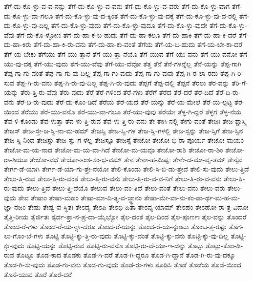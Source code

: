 {ತೆಗೆ-ದು-ಕೊ-ಳ್ಳು-ವ-ವ-ನನ್ನು
ತೆಗೆ-ದು-ಕೊ-ಳ್ಳು-ವ-ವನು
ತೆಗೆ-ದು-ಕೊ-ಳ್ಳು-ವ-ವರು
ತೆಗೆ-ದು-ಕೊ-ಳ್ಳು-ವಾಗ
ತೆಗೆ-ದು-ಕೊ-ಳ್ಳು-ವಾ-ಗಲೂ
ತೆಗೆ-ದು-ಕೊ-ಳ್ಳು-ವು-ದ-ಕ್ಕಿಂತ
ತೆಗೆ-ದು-ಕೊ-ಳ್ಳು-ವು-ದಕ್ಕೆ
ತೆಗೆ-ದು-ಕೊ-ಳ್ಳು-ವು-ದ-ರಲ್ಲಿ
ತೆಗೆ-ದು-ಕೊ-ಳ್ಳು-ವು-ದಿಲ್ಲ
ತೆಗೆ-ದು-ಕೊ-ಳ್ಳು-ವುದು
ತೆಗೆ-ದು-ಕೊ-ಳ್ಳು-ವುದೂ
ತೆಗೆ-ದು-ಕೊ-ಳ್ಳು-ವುದೇ
ತೆಗೆ-ದು-ಕೊ-ಳ್ಳು-ವೆವು
ತೆಗೆ-ದು-ಕೊ-ಳ್ಳೋಣ
ತೆಗೆ-ದು-ಹಾ-ಕ-ಬ-ಹುದು
ತೆಗೆ-ದು-ಹಾ-ಕಲೂ
ತೆಗೆ-ದು-ಹಾಕಿ
ತೆಗೆ-ದು-ಹಾ-ಕಿ-ದರೆ
ತೆಗೆ-ದು-ಹಾ-ಕಿರು
ತೆಗೆ-ದು-ಹಾ-ಕಿ-ರು-ವನು
ತೆಗೆ-ದು-ಹಾ-ಕು-ವಂತೆ
ತೆಗೆಯ
ತೆಗೆ-ಯ-ಬ-ಹುದು
ತೆಗೆ-ಯ-ಬೇ-ಕಾ-ದರೆ
ತೆಗೆ-ಯ-ಬೇಕು
ತೆಗೆಯು
ತೆಗೆ-ಯು-ತ್ತಾನೆ
ತೆಗೆ-ಯು-ತ್ತಾ-ನೆಯೊ
ತೆಗೆ-ಯುವ
ತೆಗೆ-ಯು-ವನು
ತೆಗೆ-ಯು-ವನೋ
ತೆಗೆ-ಯು-ವು-ದಕ್ಕೆ
ತೆಗೆ-ಯು-ವುದು
ತೆಗೆ-ಯು-ವೆವು
ತೆಗೆ-ಯು-ವೆವೋ
ತೆತ್ತ
ತೆನೆ
ತೆನೆ-ಗಳನ್ನೆಲ್ಲ
ತೆನೆ-ಯನ್ನು
ತೆಪ್ಪ-ಗಾಗಿ
ತೆಪ್ಪ-ಗಾ-ಗು-ವಂತೆ
ತೆಪ್ಪ-ಗಾ-ಗು-ವು-ದಿಲ್ಲ
ತೆಪ್ಪ-ಗಾ-ಗು-ವುದು
ತೆಪ್ಪ-ಗಾ-ಗು-ವುವು
ತೆಪ್ಪ-ಗಿ-ರ-ಲಾ-ರದು
ತೆಪ್ಪ-ಗಿ-ರಿ-ಸುವ
ತೆಪ್ಪ-ಗಿ-ರು-ವನು
ತೆಪ್ಪ-ಗಿ-ರು-ವು-ದಿಲ್ಲ
ತೆಪ್ಪ-ಗಿ-ರು-ವುದು
ತೆಪ್ಪಗೆ
ತೆಪ್ಪ-ದಲ್ಲಿ
ತೆಪ್ಪನೆ
ತೆರಲು
ತೆರ-ವನ್ನು
ತೆರಿ-ಗೆ-ಯನ್ನು
ತೆರು-ತ್ತಿ-ರು-ವೆವು
ತೆರು-ವುದು
ತೆರೆ
ತೆರೆ-ಗಳಿಂದ
ತೆರೆ-ಗಳು
ತೆರೆಗೆ
ತೆರೆದ
ತೆರೆ-ದರೆ
ತೆರೆ-ದಿದೆ
ತೆರೆ-ದಿ-ರು-ವನು
ತೆರೆ-ದಿ-ರು-ವುದು
ತೆರೆ-ದು-ಕೊಂ-ಡಿದೆ
ತೆರೆಯ
ತೆರೆ-ಯದೆ
ತೆರೆ-ಯನ್ನು
ತೆರೆ-ಯ-ಮೇಲೆ
ತೆರೆ-ಯ-ಲ್ಪಟ್ಟ
ತೆರೆ-ಯಿಂದ
ತೆರೆಯು
ತೆರೆ-ಯು-ವನೊ
ತೆರೆ-ಯು-ವಾ-ಗಲೂ
ತೆರೆ-ಯು-ವುವು
ತೆರೆಯೇ
ತೆಳ್ಳ-ಗಿ-ದ್ದರೆ
ತೆಳ್ಳಗೆ
ತೆಳ್ಳ-ನೆಯ
ತೆವ-ಳಿ-ಕೊಂಡು
ತೆವ-ಳುತ್ತಾ
ತೆವ-ಳು-ತ್ತಿ-ರುವ
ತೆವ-ಳು-ತ್ತಿ-ರು-ವನು
ತೇ
ತೇಗಿ-ನಲ್ಲಿ
ತೇಗು-ವಂತೆ
ತೇಜಃ
ತೇಜ-ಶ್ಚಾಸ್ಮಿ
ತೇಜಸ್
ತೇಜ-ಸ್ತೇ-ಜ-ಸ್ವಿ-ನಾ-ಮ-ಹಮ್
ತೇಜಸ್ವಿ
ತೇಜ-ಸ್ವಿ-ಗಳ
ತೇಜ-ಸ್ವಿ-ಗಳಲ್ಲಿ
ತೇಜ-ಸ್ಸನ್ನು
ತೇಜ-ಸ್ಸಿಗೆ
ತೇಜ-ಸ್ಸಿನ
ತೇಜ-ಸ್ಸಿ-ನಿಂದ
ತೇಜಸ್ಸು
ತೇಜ-ಸ್ಸು-ಗ-ಳೆಲ್ಲ
ತೇಜಸ್ಸೂ
ತೇಜಸ್ಸೆ
ತೇಜೋ
ತೇಜೋ-ಭಿ-ರಾ-ಪೂರ್ಯ
ತೇಜೋ-ಮಯಂ
ತೇಜೋ-ಮ-ಯ-ನಾದ
ತೇಜೋ-ಮ-ಯ-ವಾ-ಗಿದೆ
ತೇಜೋ-ಮ-ಯವೂ
ತೇಜೋ-ರಾಶಿ
ತೇಜೋ-ರಾ-ಶಿಂ
ತೇಜೋ-ರಾ-ಶಿಯೂ
ತೇಜೋ-ವಧೆ
ತೇಜೋ-ಽಂಶ-ಸಂ-ಭ-ವಮ್
ತೇನ
ತೇನಾ-ಹ-ಮಿಷ್ಟಃ
ತೇನೇ-ದ-ಮಾ-ವೃ-ತಮ್
ತೇನೈವ
ತೇರ್ಗ-ಡೆ-ಯಾಗಿ
ತೇರ್ಗ-ಡೆ-ಯಾ-ಗು-ತ್ತೇ-ನೆಯೋ
ತೇಲಿ-ಕೊಂಡು
ತೇಲಿ-ಸಿ-ಬಿ-ಡು-ತ್ತೇವೆ
ತೇಲಿ-ಸು-ವುದು
ತೇಲು-ತ್ತಿದೆ
ತೇಲು-ತ್ತಿ-ರುವ
ತೇಲು-ತ್ತಿ-ರು-ವಂತೆ
ತೇಲು-ತ್ತಿ-ರು-ವನು
ತೇಲು-ತ್ತಿ-ರು-ವ-ವ-ನಿಗೆ
ತೇಲು-ತ್ತಿ-ರು-ವ-ವನು
ತೇಲು-ತ್ತಿ-ರು-ವುದು
ತೇಲು-ತ್ತಿವೆ
ತೇಲು-ತ್ತಿ-ವೆಯೊ
ತೇಲುವ
ತೇಲು-ವಂ-ತಿದೆ
ತೇಲು-ವಂತೆ
ತೇಲು-ವನು
ತೇಲು-ವರು
ತೇಲು-ವುದು
ತೇವ
ತೇಷಾಂ
ತೇಷಾ-ಮಹಂ
ತೇಷಾ-ಮಾ-ದಿ-ತ್ಯ-ವ-ಜ್ಜ್ಞಾನಂ
ತೇಷಾ-ಮೇ-ವಾ-ನು-ಕಂ-ಪಾ-ರ್ಥ-ಮ-ಹ-ಮ-ಜ್ಞಾ-ನಜಂ
ತೇಷು
ತೇಷ್ವ-ವ-ಸ್ಥಿತಃ
ತೇಽದ್ಯ
ತೇಽಪಿ
ತೇಽಭಿ-ಹಿತಾ
ತೇಽವ್ಯ-ಯಾಮ್
ತೇಽಹಂ
ತೇಽಹೋ-ರಾ-ತ್ರ-ವಿದೋ
ತೈತ್ತಿ-ರೀಯ
ತೈರ್ಜಿತಃ
ತೈರ್ದ-ತ್ತಾ-ನ-ಪ್ರ-ದಾ-ಯೈಭ್ಯೋ
ತೈಲ-ದಂತೆ
ತೈಲ-ದಿಂದ
ತೈಲ-ಪೂರ್ಣಃ
ತೈಲ-ವನ್ನು
ತೊಂದರೆ
ತೊಂದ-ರೆ-ಗಳು
ತೊಂದ-ರೆ-ಯ-ನ್ನಾ-ದರೂ
ತೊಂದ-ರೆ-ಯನ್ನು
ತೊಂದ-ರೆ-ಯ-ನ್ನುಂಟು
ತೊಂಬ-ತ್ತ-ರಷ್ಟು
ತೊಗ-ಲು-ಗೊಂ-ಬೆ-ಗಳು
ತೊಟ್ಟಿ
ತೊಟ್ಟಿ-ಕ್ಕು-ತ್ತಿ-ರು-ವುದು
ತೊಟ್ಟಿ-ಕ್ಕು-ವಂತೆ
ತೊಟ್ಟಿ-ಕ್ಕು-ವನು
ತೊಟ್ಟಿ-ಕ್ಕು-ವು-ದಿಲ್ಲ
ತೊಟ್ಟಿ-ಕ್ಕು-ವುದು
ತೊಟ್ಟಿ-ಯನ್ನು
ತೊಟ್ಟಿ-ರುವ
ತೊಟ್ಟಿ-ರು-ವನೊ
ತೊಟ್ಟಿ-ರು-ವೆ-ಯಾ-ಇ-ದನ್ನು
ತೊಟ್ಟು
ತೊಟ್ಟು-ಕೊಂ-ಡಿ-ರುವ
ತೊಟ್ಟೂ
ತೊಡ-ಕಾದ
ತೊಡಕು
ತೊಡ-ಗಿ-ದರೆ
ತೊಡ-ಗಿ-ದ್ದರೂ
ತೊಡ-ಗಿ-ದ್ದಾನೆ
ತೊಡ-ಗಿ-ರು-ವು-ದಕ್ಕೂ
ತೊಡ-ಗಿ-ಸು-ವುದು
ತೊಡ-ಗು-ವನು
ತೊಡ-ಗು-ವುದು
ತೊಡ-ರು-ಗಳು
ತೊಡಿಸಿ
ತೊಡೆ
ತೊಡೆಯ
ತೊಡೆ-ಯಿಂದ
ತೊನೆ-ಯುವ
ತೊರೆ
ತೊರೆ-ದರೆ
}
